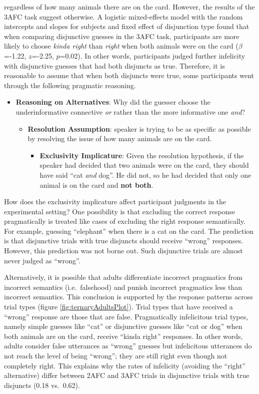 \documentclass[oneside]{report}
\theoremstyle{definition}
\theoremstyle{definition}
\theoremstyle{definition}
\theoremstyle{remark}
\begin{document}
regardless of how many animals there are on the card. However, the
results of the 3AFC task suggest otherwise. A logistic mixed-effects
model with the random intercepts and slopes for subjects and fixed
effect of disjunction type found that when comparing disjunctive guesses
in the 3AFC task, participants are more likely to choose \emph{kinda
right} than \emph{right} when both animals were on the card
(\(\beta\)=-1.22, \(z\)=-2.25, \(p\)=0.02). In other words, participants
judged further infelicity with disjunctive guesses that had both
disjuncts as true. Therefore, it is reasonable to assume that when both
disjuncts were true, some participants went through the following
pragmatic reasoning.
\begin{itemize}
\tightlist
\item
  \textbf{Reasoning on Alternatives}: Why did the guesser choose the
  underinformative connective \emph{or} rather than the more informative
  one \emph{and}?
  \begin{itemize}
  \tightlist
  \item
    \textbf{Resolution Assumption}: speaker is trying to be as specific
    as possible by resolving the issue of how many animals are on the
    card.
    \begin{itemize}
    \tightlist
    \item
      \textbf{Exclusivity Implicature}: Given the resolution hypothesis,
      if the speaker had decided that two animals were on the card, they
      should have said ``cat \emph{and} dog''. He did not, so he had
      decided that only one animal is on the card and \textbf{not both}.
    \end{itemize}
  \end{itemize}
\end{itemize}
How does the exclusivity implicature affect participant judgments in the
experimental setting? One possibility is that excluding the correct
response pragmatically is treated like cases of excluding the right
response semantically. For example, guessing ``elephant'' when there is
a cat on the card. The prediction is that disjunctive trials with true
disjuncts should receive ``wrong'' responses. However, this prediction
was not borne out. Such disjunctive trials are almost never judged as
``wrong''.

Alternatively, it is possible that adults differentiate incorrect
pragmatics from incorrect semantics (i.e.~falsehood) and punish
incorrect pragmatics less than incorrect semantics. This conclusion is
supported by the response patterns across trial types (figure
\ref{fig:ternaryAdultsPlot}). Trial types that have received a ``wrong''
response are those that are false. Pragmatically infelicitous trial
types, namely simple guesses like ``cat'' or disjunctive guesses like
``cat or dog'' when both animals are on the card, receive ``kinda
right'' responses. In other words, adults consider false utterances as
``wrong'' guesses but infelicitous utterances do not reach the level of
being ``wrong''; they are still right even though not completely right.
This explains why the rates of infelicity (avoiding the ``right''
alternative) differ between 2AFC and 3AFC trials in disjunctive trials
with true disjuncts (0.18 vs.~0.62).
\end{document}
